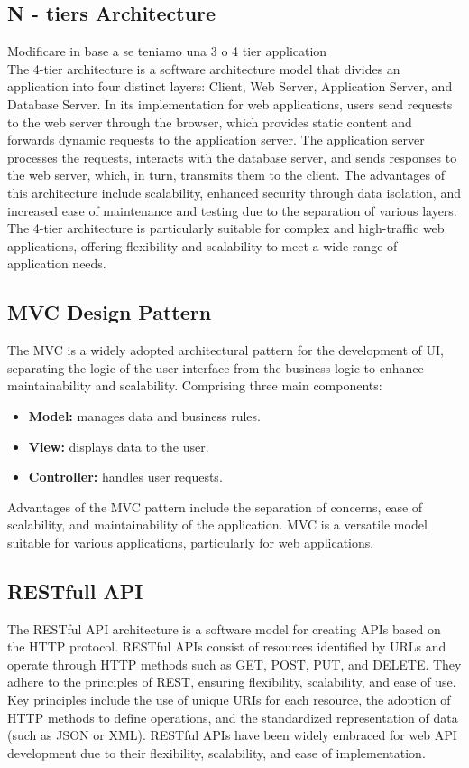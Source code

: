 \subsection{N - tiers Architecture}
{\color{red} Modificare in base a se teniamo una 3 o 4 tier application \\}
The 4-tier architecture is a software architecture model that divides an application into four distinct layers: Client, Web Server, Application Server, and Database Server. 
In its implementation for web applications, users send requests to the web server through the browser, which provides static content and forwards dynamic requests to the application server. 
The application server processes the requests, interacts with the database server, and sends responses to the web server, which, in turn, transmits them to the client.
The advantages of this architecture include scalability, enhanced security through data isolation, and increased ease of maintenance and testing due to the separation of various layers. 
The 4-tier architecture is particularly suitable for complex and high-traffic web applications, offering flexibility and scalability to meet a wide range of application needs.

\subsection{MVC Design Pattern}
The MVC is a widely adopted architectural pattern for the development of UI, separating the logic of the user interface from the business logic to enhance maintainability and scalability. 
Comprising three main components:
\begin{itemize}
    \item \textbf{Model:} manages data and business rules.
    \item \textbf{View:} displays data to the user.
    \item \textbf{Controller:} handles user requests.
\end{itemize} 
Advantages of the MVC pattern include the separation of concerns, ease of scalability, and maintainability of the application. 
MVC is a versatile model suitable for various applications, particularly for web applications.

\subsection{RESTfull API}
The RESTful API architecture is a software model for creating APIs based on the HTTP protocol. 
RESTful APIs consist of resources identified by URLs and operate through HTTP methods such as GET, POST, PUT, and DELETE. 
They adhere to the principles of REST, ensuring flexibility, scalability, and ease of use. 
Key principles include the use of unique URIs for each resource, the adoption of HTTP methods to define operations, and the standardized representation of data (such as JSON or XML). 
RESTful APIs have been widely embraced for web API development due to their flexibility, scalability, and ease of implementation.

